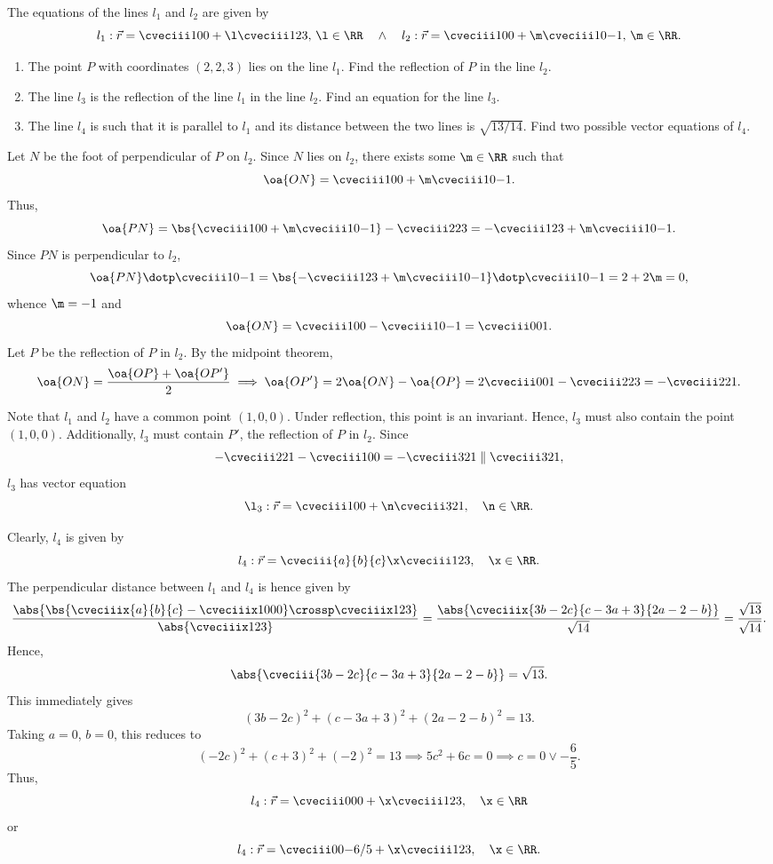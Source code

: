\begin{problem}[\chili]
    The equations of the lines $l_1$ and $l_2$ are given by \[l_1: \vec r = \cveciii100 + \l \cveciii123, \, \l \in \RR \quad \land \quad l_2: \vec r = \cveciii100 + \m \cveciii10{-1}, \, \m \in \RR.\]

    \begin{enumerate}
        \item The point $P$ with coordinates $(2, 2, 3)$ lies on the line $l_1$. Find the reflection of $P$ in the line $l_2$.
        \item The line $l_3$ is the reflection of the line $l_1$ in the line $l_2$. Find an equation for the line $l_3$.
        \item The line $l_4$ is such that it is parallel to $l_1$ and its distance between the two lines is $\sqrt{13/14}$. Find two possible vector equations of $l_4$.
    \end{enumerate}
\end{problem}
\begin{solution}
    \begin{ppart}
        Let $N$ be the foot of perpendicular of $P$ on $l_2$. Since $N$ lies on $l_2$, there exists some $\m \in \RR$ such that \[\oa{ON} = \cveciii100 + \m \cveciii10{-1}.\] Thus, \[\oa{PN} = \bs{\cveciii100 + \m \cveciii10{-1}} - \cveciii223 = -\cveciii123 + \m \cveciii10{-1}.\] Since $PN$ is perpendicular to $l_2$, \[\oa{PN} \dotp \cveciii10{-1} = \bs{-\cveciii123 + \m \cveciii10{-1}} \dotp \cveciii10{-1} = 2 + 2\m = 0,\] whence $\m = -1$ and \[\oa{ON} = \cveciii100 - \cveciii10{-1} = \cveciii001.\] Let $P$ be the reflection of $P$ in $l_2$. By the midpoint theorem, \[\oa{ON} = \frac{\oa{OP} + \oa{OP'}}{2} \implies \oa{OP'} = 2\oa{ON} - \oa{OP} = 2\cveciii001 - \cveciii223 = -\cveciii221.\]
    \end{ppart}
    \begin{ppart}
        Note that $l_1$ and $l_2$ have a common point $(1, 0, 0)$. Under reflection, this point is an invariant. Hence, $l_3$ must also contain the point $(1, 0, 0)$. Additionally, $l_3$ must contain $P'$, the reflection of $P$ in $l_2$. Since \[-\cveciii221 - \cveciii100 = -\cveciii321 \parallel \cveciii321,\] $l_3$ has vector equation \[\l_3 : \vec r = \cveciii100 + \n \cveciii321, \quad \n \in \RR.\]
    \end{ppart}
    \begin{ppart}
        Clearly, $l_4$ is given by \[l_4: \vec r = \cveciii{a}{b}{c} \x \cveciii123, \quad \x \in \RR.\] The perpendicular distance between $l_1$ and $l_4$ is hence given by \[\frac{\abs{\bs{\cveciiix{a}{b}{c} - \cveciiix1000} \crossp \cveciiix123}}{\abs{\cveciiix123}} = \frac{\abs{\cveciiix{3b-2c}{c-3a+3}{2a-2-b}}}{\sqrt{14}} = \frac{\sqrt{13}}{\sqrt{14}}.\] Hence, \[\abs{\cveciii{3b-2c}{c-3a+3}{2a-2-b}} = \sqrt{13}.\] This immediately gives \[(3b-2c)^2 + (c-3a+3)^2 + (2a-2-b)^2 = 13.\] Taking $a = 0$, $b=0$, this reduces to \[(-2c)^2 + (c+3)^2 + (-2)^2 = 13 \implies 5c^2 + 6c = 0 \implies c = 0 \lor -\frac65.\] Thus, \[l_4 : \vec r = \cveciii000 + \x \cveciii123, \quad \x \in \RR\] or \[l_4: \vec r = \cveciii00{-6/5} + \x \cveciii123, \quad \x \in \RR.\]
    \end{ppart}
\end{solution}